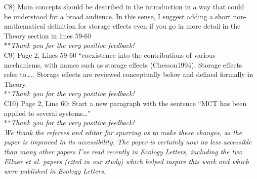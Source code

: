 \documentclass[letterpaper,11pt]{article}
\begin{document}
\noindent C8) Main concepts should be described in the introduction in a way that could be understood for a broad audience. In this sense, I suggest adding a short non- mathematical definition for storage effects even if you go in more detail in the Theory section in lines 59-60 \\

\noindent ***\emph{Thank you for the very positive feedback!} \\

\noindent C9) Page 2, Lines 59-60 “coexistence into the contributions of various mechanisms, with names such as storage effects (Chesson1994). Storage effects refer to….. Storage effects are reviewed conceptually below and defined formally in Theory. \\  

\noindent ***\emph{Thank you for the very positive feedback!} \\

\noindent C10)  Page 2, Line 60: Start a new paragraph with the sentence “MCT has been applied to several systems…” \\

\noindent ***\emph{Thank you for the very positive feedback!} \\

\emph{We thank the referees and editor for spurring us to make these changes, as the paper is improved in
its accessibility. The paper is certainly now no less accessible than many other papers I've read recently in 
Ecology Letters, including the two Ellner et al. papers (cited in our study) which helped inspire this 
work and which were published in Ecology Letters.} 
\end{document}
